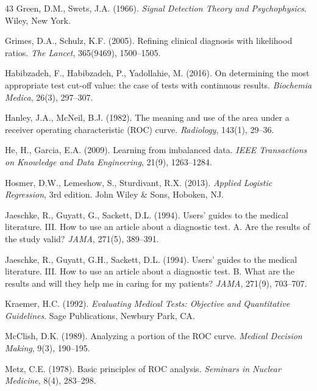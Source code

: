 \documentclass[11pt]{article}
\begin{document}
\begin{thebibliography}{43}
Green, D.M., Swets, J.A. (1966).
\textit{Signal Detection Theory and Psychophysics}.
Wiley, New York.

Grimes, D.A., Schulz, K.F. (2005).
Refining clinical diagnosis with likelihood ratios.
\textit{The Lancet}, 365(9469), 1500--1505.

Habibzadeh, F., Habibzadeh, P., Yadollahie, M. (2016).
On determining the most appropriate test cut-off value: the case of tests
with continuous results.
\textit{Biochemia Medica}, 26(3), 297--307.

Hanley, J.A., McNeil, B.J. (1982).
The meaning and use of the area under a receiver operating characteristic
(ROC) curve.
\textit{Radiology}, 143(1), 29--36.

He, H., Garcia, E.A. (2009).
Learning from imbalanced data.
\textit{IEEE Transactions on Knowledge and Data Engineering}, 21(9),
1263--1284.

Hosmer, D.W., Lemeshow, S., Sturdivant, R.X. (2013).
\textit{Applied Logistic Regression}, 3rd edition.
John Wiley \& Sons, Hoboken, NJ.

Jaeschke, R., Guyatt, G., Sackett, D.L. (1994).
Users' guides to the medical literature. III. How to use an article about a
diagnostic test. A. Are the results of the study valid?
\textit{JAMA}, 271(5), 389--391.

Jaeschke, R., Guyatt, G.H., Sackett, D.L. (1994).
Users' guides to the medical literature. III. How to use an article about a
diagnostic test. B. What are the results and will they help me in caring
for my patients?
\textit{JAMA}, 271(9), 703--707.

Kraemer, H.C. (1992).
\textit{Evaluating Medical Tests: Objective and Quantitative Guidelines}.
Sage Publications, Newbury Park, CA.

McClish, D.K. (1989).
Analyzing a portion of the ROC curve.
\textit{Medical Decision Making}, 9(3), 190--195.

Metz, C.E. (1978).
Basic principles of ROC analysis.
\textit{Seminars in Nuclear Medicine}, 8(4), 283--298.


\end{thebibliography}
\end{document}
